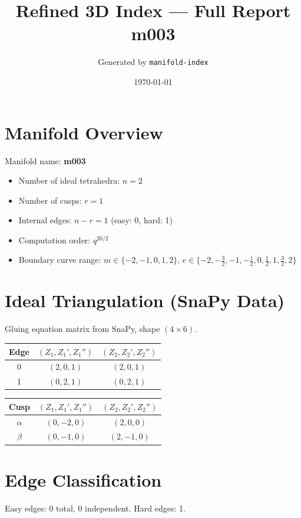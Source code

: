 \documentclass[11pt,a4paper]{article}
\begin{document}
\title{Refined 3D Index — Full Report \\ \large m003}
\author{Generated by \texttt{manifold-index}}
\date{\today}
\maketitle
\tableofcontents
\newpage

\section{Manifold Overview}
Manifold name: \textbf{m003}

\begin{itemize}
  \item Number of ideal tetrahedra: $n = 2$
  \item Number of cusps: $r = 1$
  \item Internal edges: $n - r = 1$ (easy: 0, hard: 1)
  \item Computation order: $q^{20/2}$
  \item Boundary curve range: $m \in \{-2, -1, 0, 1, 2\}$, $e \in \{-2, -\tfrac{3}{2}, -1, -\tfrac{1}{2}, 0, \tfrac{1}{2}, 1, \tfrac{3}{2}, 2\}$
\end{itemize}

\section{Ideal Triangulation (SnaPy Data)}
Gluing equation matrix from SnaPy, shape $(4 \times 6)$.

\begin{longtable}{c c c}
\toprule
Edge & $(Z_{1}, Z_{1}', Z_{1}'')$ & $(Z_{2}, Z_{2}', Z_{2}'')$ \\ \midrule
\endhead
0 & $(2, 0, 1)$ & $(2, 0, 1)$ \\
1 & $(0, 2, 1)$ & $(0, 2, 1)$ \\
\bottomrule
\end{longtable}

\begin{longtable}{c c c}
\toprule
Cusp & $(Z_{1}, Z_{1}', Z_{1}'')$ & $(Z_{2}, Z_{2}', Z_{2}'')$ \\ \midrule
\endhead
$\alpha$ & $(0, -2, 0)$ & $(2, 0, 0)$ \\
$\beta$ & $(0, -1, 0)$ & $(2, -1, 0)$ \\
\bottomrule
\end{longtable}

\section{Edge Classification}
Easy edges: 0 total, 0 independent. Hard edges: 1.
\end{document}
